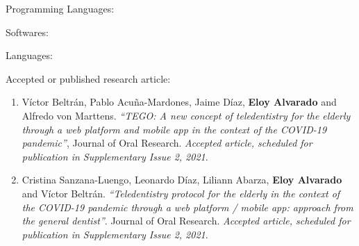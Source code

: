 \documentclass[10pt,a4paper]{article}
\begin{document}


\headedsubsection 
{Programming Languages:}
{}
{}


\headedsubsection 
{Softwares:}
{}
{}

\headedsubsection 
{Languages:}
{}
{}







\headedsubsection 
{Accepted or published research article:}{}
{
\begin{enumerate}
\item Víctor Beltrán, Pablo Acuña-Mardones, Jaime Díaz, \textbf{Eloy Alvarado} and Alfredo von Marttens. \textit{``TEGO: A new concept of teledentistry for the elderly through a web platform and mobile app in the context of the COVID-19 pandemic''}, Journal of Oral Research. \textit{Accepted article, scheduled for publication in Supplementary Issue 2, 2021}.

\item Cristina Sanzana-Luengo, Leonardo Díaz, Liliann Abarza, \textbf{Eloy Alvarado} and Víctor Beltrán. \textit{``Teledentistry protocol for the elderly in the context of the COVID-19 pandemic through a web platform / mobile app: approach from the general dentist''}. Journal of Oral Research. \textit{Accepted article, scheduled for publication in Supplementary Issue 2, 2021}.
\end{enumerate}
}
\end{document}
